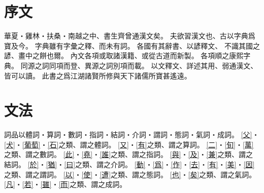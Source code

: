 \chapter*{序文}
華夏・雞林・扶桑・南越之中、書生齊曾通漢文矣。
夫欲習漢文也、古以字典爲寶及今。
字典雖有字彙之釋、而未有詞。
各國有其辭書、以諺釋文、
不識其國之諺、畫中之餅也爾。
內文各項或取諸漢籍、或從古道而新製。
各項順之康熙字典。
同源之詞同項而登、異源之詞別項而載。
以文釋文、詳述其用、弱通漢文、皆可以讀。
此書之爲江湖諸賢所修與天下諸儒所寶甚遙遠。
\chapter*{文法}
詞品以體詞・算詞・數詞・指詞・結詞・介詞・謂詞・態詞・氣詞・成詞。
\cref{父}・\cref{犬}・\cref{葡萄}・\cref{石}之類、謂之體詞。
\cref{又}・\cref{有}之類、謂之算詞。
\cref{二}・\cref{旬}・\cref{萬}之類、謂之數詞。
\cref{此}・\cref{堯}・\cref{誰}之類、謂之指詞。
\cref{與}・\cref{及}・\cref{兼}之類、謂之結詞。
\cref{於}・\cref{猶}・\cref{曰}之類、謂之介詞。
\cref{動}・\cref{爲}・\cref{作}・\cref{去}・\cref{有}・\cref{美}・\cref{因}之類、謂之謂詞。
\cref{以}・\cref{使}・\cref{遭}之類、謂之態詞。
\cref{也}・\cref{矣}之類、謂之氣詞。
\cref{凡}・\cref{若}・\cref{雖}・\cref{而}之類、謂之成詞。
